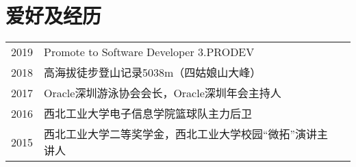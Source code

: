 \documentclass[]{deedy-resume-openfont}
\begin{document}
\begin{minipage}[t]{0.73\textwidth}
\section{爱好及经历} 
\begin{tabular}{rll}
2019       & Promote to Software Developer 3.PRODEV \\
2018	     & 高海拔徒步登山记录5038m（四姑娘山大峰） \\
2017	     & Oracle深圳游泳协会会长，Oracle深圳年会主持人 \\
2016	     & 西北工业大学电子信息学院篮球队主力后卫 \\
2015       & 西北工业大学二等奖学金，西北工业大学校园“微拓”演讲主讲人 \\

\end{tabular}
\sectionsep


% 
% 

\end{minipage} 
\end{document}
